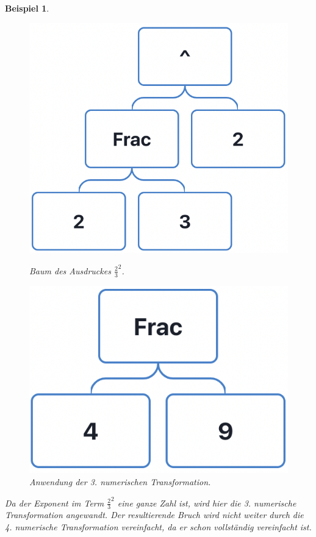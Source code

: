 \documentclass[11pt]{article}
\newtheorem{example}{Beispiel}
\begin{document}
\begin{example} \normalfont
  \begin{figure}[h]
    \begin{minipage}{.5\textwidth}
      \centering
      \includegraphics[scale=0.4]{trees/power/beispiel_1_1.png}
      \caption{Baum des Ausdruckes $\frac{2}{3}^2$.}
    \end{minipage}
    \begin{minipage}{.5\textwidth}
      \centering
      \includegraphics[scale=0.4]{trees/power/beispiel_1_2.png}
      \caption{Anwendung der 3. numerischen Transformation.}
    \end{minipage}
  \end{figure}
  Da der Exponent im Term $\frac{2}{3}^2$ eine ganze Zahl ist, wird hier die 3. numerische Transformation angewandt. 
  Der resultierende Bruch wird nicht weiter durch die 4. numerische Transformation vereinfacht,
  da er schon vollständig vereinfacht ist.
\end{example}
\end{document}

